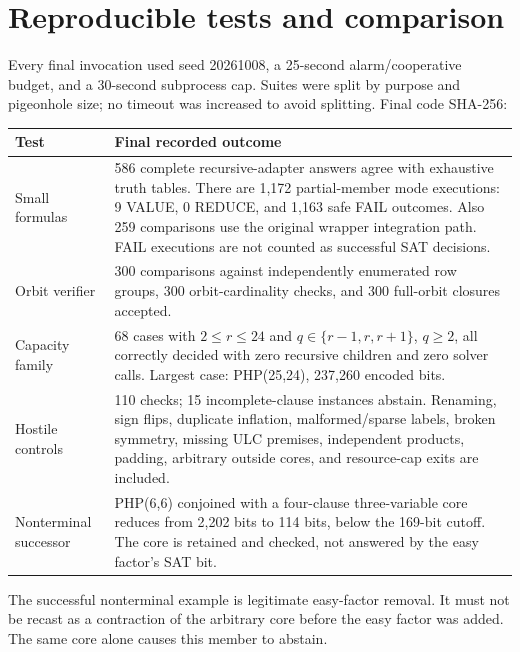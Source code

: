 \documentclass[11pt]{article}
\begin{document}
\section{Reproducible tests and comparison}
Every final invocation used seed 20261008, a 25-second alarm/cooperative
budget, and a 30-second subprocess cap. Suites were split by purpose and
pigeonhole size; no timeout was increased to avoid splitting. Final code
SHA-256:
\begin{center}\small{}\end{center}

\begin{longtable}{p{.24\linewidth}p{.67\linewidth}}
\toprule
Test & Final recorded outcome \\
\midrule
Small formulas & 586 complete recursive-adapter answers agree with exhaustive
truth tables. There are 1,172 partial-member mode executions: 9 VALUE,
0 REDUCE, and 1,163 safe FAIL outcomes. Also 259 comparisons use the original
wrapper integration path. FAIL executions are not counted as successful
SAT decisions. \\
Orbit verifier & 300 comparisons against independently enumerated row groups,
300 orbit-cardinality checks, and 300 full-orbit closures accepted. \\
Capacity family & 68 cases with $2\le r\le24$ and $q\in\{r-1,r,r+1\}$,
$q\ge2$, all correctly decided with zero recursive children and zero solver
calls. Largest case: PHP(25,24), 237,260 encoded bits. \\
Hostile controls & 110 checks; 15 incomplete-clause instances abstain.
Renaming, sign flips, duplicate inflation, malformed/sparse labels, broken
symmetry, missing ULC premises, independent products, padding, arbitrary
outside cores, and resource-cap exits are included. \\
Nonterminal successor & PHP(6,6) conjoined with a four-clause three-variable
core reduces from 2,202 bits to 114 bits, below the 169-bit cutoff. The core
is retained and checked, not answered by the easy factor's SAT bit. \\
\bottomrule
\end{longtable}

The successful nonterminal example is legitimate easy-factor removal. It
must not be recast as a contraction of the arbitrary core before the easy
factor was added. The same core alone causes this member to abstain.
\end{document}
